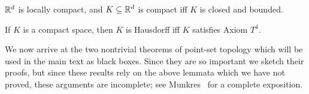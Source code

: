 \begin{theorem}
$\mathbb{R}^d$ is locally compact, and $K \subseteq \mathbb{R}^d$ is compact iff $K$ is closed and bounded.
\end{theorem}

\begin{lemma}
If $K$ is a compact space, then $K$ is Hausdorff iff $K$ satisfies Axiom $T^4$.
\end{lemma}

\begin{subsec}
We now arrive at the two nontrivial theorems of point-set topology which will be used in the main text as black boxes.
Since they are so important we sketch their proofs, but since these results rely on the above lemmata which we have not proved, these arguments are incomplete; see Munkres~\cite{munkres2000topology} for a complete exposition.
\end{subsec}

